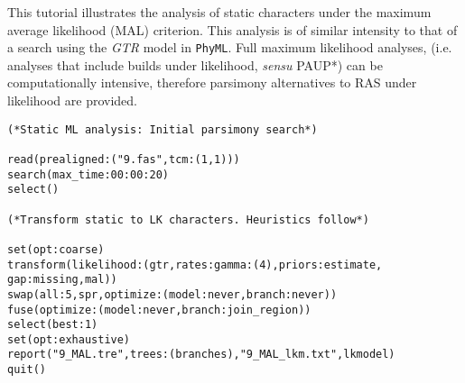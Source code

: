 This tutorial illustrates the analysis of static characters under the 
maximum average likelihood (MAL) criterion. This analysis is 
of similar intensity to that of a search using the \emph{GTR} 
model in \texttt{PhyML}.  Full maximum likelihood analyses, 
(i.e. analyses that include builds under likelihood, \textit{sensu} 
PAUP*)  can be computationally intensive, therefore parsimony 
alternatives to RAS under likelihood are provided. 

\begin{verbatim}
(*Static ML analysis: Initial parsimony search*)

read(prealigned:("9.fas",tcm:(1,1)))
search(max_time:00:00:20)
select()

(*Transform static to LK characters. Heuristics follow*)

set(opt:coarse)
transform(likelihood:(gtr,rates:gamma:(4),priors:estimate, 
gap:missing,mal))
swap(all:5,spr,optimize:(model:never,branch:never))
fuse(optimize:(model:never,branch:join_region))
select(best:1)
set(opt:exhaustive)
report("9_MAL.tre",trees:(branches),"9_MAL_lkm.txt",lkmodel)
quit()
\end{verbatim}


